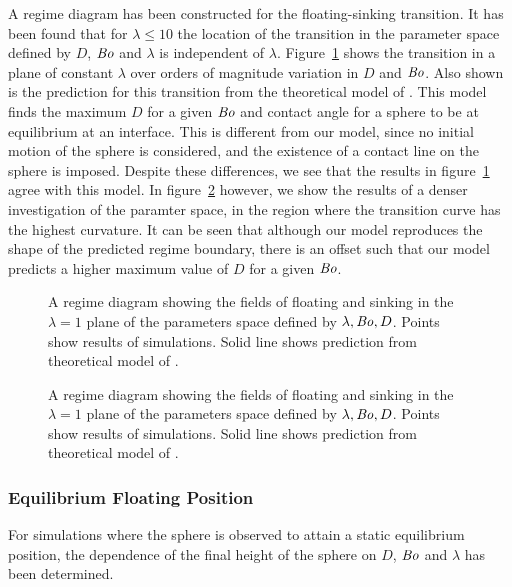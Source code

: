 \documentclass[12pt]{article}
\newcommand\Bo{\mbox{\textit{Bo}}}  %
\begin{document}
A regime diagram has been constructed for the floating-sinking transition. It has been found that for $\lambda \leq 10$ the location of the transition in the parameter space defined by $D$, $\Bo$ and $\lambda$ is independent of $\lambda$. Figure~\ref{fig:regime} shows the transition in a plane of constant $\lambda$ over orders of magnitude variation in $D$ and $\Bo$. Also shown is the prediction for this transition from the theoretical model of \citep{Vella06}. This model finds the maximum $D$ for a given $\Bo$ and contact angle for a sphere to be at equilibrium at an interface. This is different from our model, since no initial motion of the sphere is considered, and the existence of a contact line on the sphere is imposed. Despite these differences, we see that the results in figure~\ref{fig:regime} agree with this model. In figure~\ref{fig:zoom_regime} however, we show the results of a denser investigation of the paramter space, in the region where the transition curve has the highest curvature. It can be seen that although our model reproduces the shape of the predicted regime boundary, there is an offset such that our model predicts a higher maximum value of $D$ for a given $\Bo$.

  \begin{figure}
    \resizebox{0.9\textwidth}{!}{\large }
    \caption{A regime diagram showing the fields of floating and sinking in the $\lambda = 1$ plane of the parameters space defined by ${\lambda, \Bo, D}$. Points show results of simulations. Solid line shows prediction from theoretical model of \citep{Vella06}.\label{fig:regime}}
  \end{figure}

  \begin{figure}
    \resizebox{0.9\textwidth}{!}{\large }
    \caption{A regime diagram showing the fields of floating and sinking in the $\lambda = 1$ plane of the parameters space defined by ${\lambda, \Bo, D}$. Points show results of simulations. Solid line shows prediction from theoretical model of \citep{Vella06}.\label{fig:zoom_regime}}
  \end{figure}

\subsubsection{Equilibrium Floating Position}
\label{subsubsec:equilib_pos}

For simulations where the sphere is observed to attain a static equilibrium position, the dependence of the final height of the sphere on $D$, $\Bo$ and $\lambda$ has been determined.  
\appendix
\end{document}
